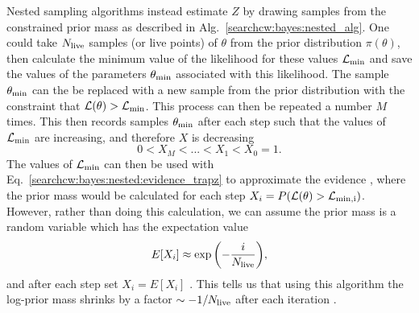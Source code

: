 Nested sampling algorithms instead estimate $Z$ by drawing samples from the constrained prior mass as described in Alg.~\ref{searchcw:bayes:nested_alg}.
One could take $N_{\rm{live}}$ samples (or live points) of $\theta$ from the prior distribution $\pi(\theta)$, then calculate the minimum value of the likelihood for these values $\mathcal{L}_{\rm{min}}$ and save the values of the parameters $\theta_{\rm{min}}$ associated with this likelihood.
The sample $\theta_{\rm{min}}$ can the be replaced with a new sample from the prior distribution with the constraint that $\mathcal{L}(\theta) > \mathcal{L}_{\rm{min}}$. This process can then be repeated a number $M$ times.
This then records samples $\theta_{\rm{min}}$ after each step such that the values of $\mathcal{L}_{\rm{min}}$ are increasing, and therefore $X$ is decreasing
\begin{equation}
	0 < X_M < ... < X_1 < X_0 = 1.
\end{equation}
The values of $\mathcal{L}_{\rm{min}}$ can then be used with Eq.~\ref{searchcw:bayes:nested:evidence_trapz} to approximate the evidence , where the prior mass would be calculated for each step $X_i = P(\mathcal{L}(\theta) > \mathcal{L}_{\rm{min},i})$.
However, rather than doing this calculation, we can assume the prior mass is a random variable which has the expectation value
\begin{equation}
E[X_i] \approx \exp{\left(-\frac{i}{N_{\rm{live}}}\right)},
\end{equation}
and after each step set $X_i = E[X_i]$ \citep{feroz2019ImportanceNested}.
This tells us that using this algorithm the log-prior mass shrinks by a factor $\sim -1/N_{\rm{live}}$ after each iteration \citep{speagle2019DynestyDynamic}. 


